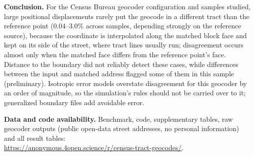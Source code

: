 \documentclass[runningheads]{llncs}
\begin{document}
\textbf{Conclusion.} For the Census Bureau geocoder configuration and samples studied, large positional displacements rarely put the geocode in a different tract than the reference point (0.04--3.0\% across samples, depending strongly on the reference source), because the coordinate is interpolated along the matched block face and kept on its side of the street, where tract lines usually run; disagreement occurs almost only when the matched face differs from the reference point's face. Distance to the boundary did not reliably detect these cases, while differences between the input and matched address flagged some of them in this sample (preliminary). Isotropic error models overstate disagreement for this geocoder by an order of magnitude, so the simulation's rules should not be carried over to it; generalized boundary files add avoidable error.

{\sloppy\textbf{Data and code availability.} Benchmark, code, supplementary tables, raw geocoder outputs (public open-data street addresses, no personal information) and all result tables:\\ \url{https://anonymous.4open.science/r/census-tract-geocodes/}.\par} %
\end{document}
